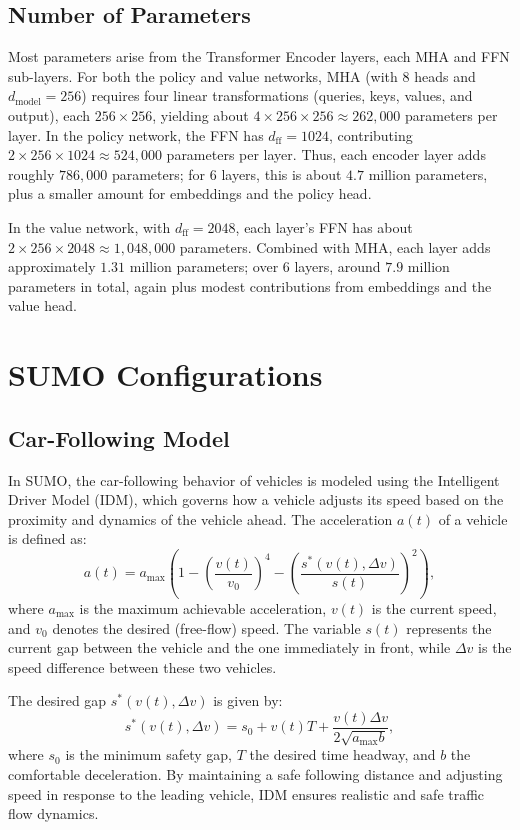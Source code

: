 \subsection{Number of Parameters}\label{subsec:number_of_parameters}
Most parameters arise from the Transformer Encoder layers, each MHA and FFN sub-layers. For both the policy and value networks, MHA (with $8$ heads and $d_{\text{model}}=256$) requires four linear transformations (queries, keys, values, and output), each $256\times256$, yielding about $4 \times 256 \times 256 \approx 262{,}000$ parameters per layer. In the policy network, the FFN has $d_{\text{ff}}=1024$, contributing $2 \times 256 \times 1024 \approx 524{,}000$ parameters per layer. Thus, each encoder layer adds roughly $786{,}000$ parameters; for $6$ layers, this is about $4.7$ million parameters, plus a smaller amount for embeddings and the policy head.

In the value network, with $d_{\text{ff}}=2048$, each layer’s FFN has about $2 \times 256 \times 2048 \approx 1{,}048{,}000$ parameters. Combined with MHA, each layer adds approximately $1.31$ million parameters; over $6$ layers, around $7.9$ million parameters in total, again plus modest contributions from embeddings and the value head.

\section{SUMO Configurations}\label{sec:sumo_configurations}
\subsection{Car-Following Model}\label{subsec:appendix_car_following}
In SUMO, the car-following behavior of vehicles is modeled using the Intelligent Driver Model (IDM), which governs how a vehicle adjusts its speed based on the proximity and dynamics of the vehicle ahead. The acceleration \(a(t)\) of a vehicle is defined as:
\[
a(t) = a_{\text{max}} \left( 1 - \left( \frac{v(t)}{v_0} \right)^4 - \left( \frac{s^*(v(t), \Delta v)}{s(t)} \right)^2 \right),
\]
where \(a_{\text{max}}\) is the maximum achievable acceleration, \(v(t)\) is the current speed, and \(v_0\) denotes the desired (free-flow) speed. The variable \(s(t)\) represents the current gap between the vehicle and the one immediately in front, while \(\Delta v\) is the speed difference between these two vehicles.

The desired gap \(s^*(v(t), \Delta v)\) is given by:
\[
s^*(v(t), \Delta v) = s_0 + v(t)T + \frac{v(t) \Delta v}{2\sqrt{a_{\text{max}} b}},
\]
where \(s_0\) is the minimum safety gap, \(T\) the desired time headway, and \(b\) the comfortable deceleration. By maintaining a safe following distance and adjusting speed in response to the leading vehicle, IDM ensures realistic and safe traffic flow dynamics.

